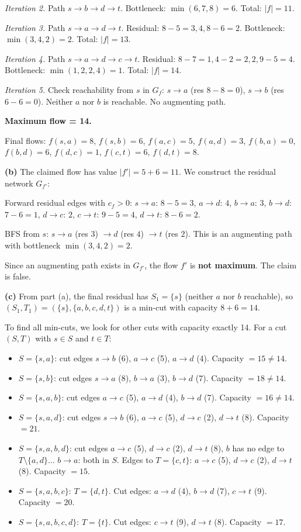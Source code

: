 \documentclass[11pt,a4paper]{article}
\begin{document}
\textit{Iteration 2.} Path $s \to b \to d \to t$. Bottleneck: $\min(6, 7, 8) = 6$. Total: $|f|=11$.

\textit{Iteration 3.} Path $s \to a \to d \to t$. Residual: $8-5=3, 4, 8-6=2$. Bottleneck: $\min(3,4,2)=2$. Total: $|f|=13$.

\textit{Iteration 4.} Path $s \to a \to d \to c \to t$.
Residual: $8-7=1, 4-2=2, 2, 9-5=4$. Bottleneck: $\min(1,2,2,4)=1$. Total: $|f|=14$.

\textit{Iteration 5.} Check reachability from $s$ in $G_f$: $s\to a$ (res $8-8=0$), $s\to b$ (res $6-6=0$). Neither $a$ nor $b$ is reachable. No augmenting path.

\textbf{Maximum flow = 14.}

Final flows: $f(s,a)=8$, $f(s,b)=6$, $f(a,c)=5$, $f(a,d)=3$, $f(b,a)=0$, $f(b,d)=6$, $f(d,c)=1$, $f(c,t)=6$, $f(d,t)=8$.

\medskip

\textbf{(b)} The claimed flow has value $|f'|=5+6=11$. We construct the residual network $G_{f'}$:

Forward residual edges with $c_f > 0$: $s\to a$: $8-5=3$, $a\to d$: $4$, $b\to a$: $3$, $b\to d$: $7-6=1$, $d\to c$: $2$, $c\to t$: $9-5=4$, $d\to t$: $8-6=2$.

BFS from $s$: $s \to a$ (res $3$) $\to d$ (res $4$) $\to t$ (res $2$). This is an augmenting path with bottleneck $\min(3,4,2)=2$.

Since an augmenting path exists in $G_{f'}$, the flow $f'$ is \textbf{not maximum}. The claim is false.
\medskip

\textbf{(c)} From part (a), the final residual has $S_1 = \{s\}$ (neither $a$ nor $b$ reachable), so $(S_1, T_1) = (\{s\}, \{a,b,c,d,t\})$ is a min-cut with capacity $8+6=14$.

To find all min-cuts, we look for other cuts with capacity exactly 14. For a cut $(S,T)$ with $s\in S$ and $t\in T$:

\begin{itemize}[nosep]
\item $S=\{s,a\}$: cut edges $s\to b$ (6), $a\to c$ (5), $a\to d$ (4). Capacity $=15\neq 14$.
\item $S=\{s,b\}$: cut edges $s\to a$ (8), $b\to a$ (3), $b\to d$ (7). Capacity $=18\neq 14$.
\item $S=\{s,a,b\}$: cut edges $a\to c$ (5), $a\to d$ (4), $b\to d$ (7). Capacity $=16\neq 14$.
\item $S=\{s,a,d\}$: cut edges $s\to b$ (6), $a\to c$ (5), $d\to c$ (2), $d\to t$ (8). Capacity $=21$.
\item $S=\{s,a,b,d\}$: cut edges $a\to c$ (5), $d\to c$ (2), $d\to t$ (8), $b$ has no edge to $T\setminus\{a,d\}$... $b\to a$: both in $S$. Edges to $T=\{c,t\}$: $a\to c$ (5), $d\to c$ (2), $d\to t$ (8). Capacity $=15$.
\item $S=\{s,a,b,c\}$: $T=\{d,t\}$. Cut edges: $a\to d$ (4), $b\to d$ (7), $c\to t$ (9). Capacity $=20$.
\item $S=\{s,a,b,c,d\}$: $T=\{t\}$. Cut edges: $c\to t$ (9), $d\to t$ (8). Capacity $=17$.
\end{itemize}
\end{document}
